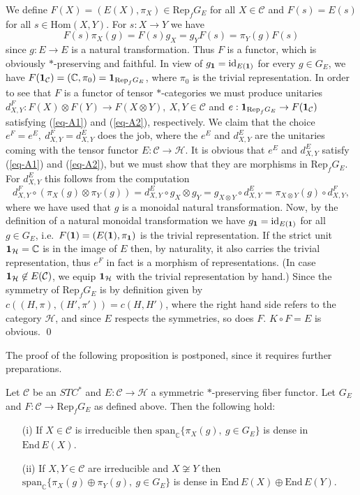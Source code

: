 \documentclass[11pt]{article}
\theoremstyle{definition}
\theoremstyle{definition}
\theoremstyle{remark}
\def\2#1{{\mathcal #1}}
\def\7#1{{\mathbb #1}}
\def\1#1{{\bf #1}}
\newcommand{\Hom}{\mathrm{Hom}}
\newcommand{\End}{\mathrm{End}}
\newcommand{\Rep}{\mathrm{Rep}}
\newcommand{\mcirc}{\circ}
\newcommand{\rarr}{\rightarrow}
\def\id{\mathrm{id}}
\begin{document}
\prf We define $F(X)=(E(X),\pi_X)\in\Rep_fG_E$ for all $X\in\2C$ and $F(s)=E(s)$ for all
$s\in\Hom(X,Y)$. For $s:X\rarr Y$ we have
\[ F(s) \pi_X(g)=F(s)g_X=g_YF(s)=\pi_Y(g)F(s) \]
since $g:E\rarr E$ is a natural transformation. Thus $F$ is a functor, which is obviously
$*$-preserving and faithful. In view of $g_\11=\id_{E(\11)}$ for every $g\in G_E$, we have
$F(\11_\2C)=(\7C,\pi_0)=\11_{\Rep_fG_E}$, where $\pi_0$ is the trivial representation. In order to
see that $F$ is a functor of tensor $*$-categories we must produce unitaries 
$d^F_{X,Y}: F(X)\otimes F(Y)\rarr F(X\otimes Y),\ X,Y\in\2C$ and 
$e:\11_{\Rep_fG_E}\rarr F(\11_\2C)$ satisfying (\ref{eq-A1}) and (\ref{eq-A2}), respectively.
We claim that the choice $e^F=e^E, \ d^F_{X,Y}=d^E_{X,Y}$ does the job, where the $e^E$ and
$d^E_{X,Y}$ are the unitaries coming with the tensor functor $E:\2C\rarr\2H$. It is obvious that  
$e^E$ and $d^E_{X,Y}$ satisfy (\ref{eq-A1}) and (\ref{eq-A2}), but we must show that they are
morphisms in $\Rep_fG_E$. For $d^E_{X,Y}$ this follows from the computation
\[ d^F_{X,Y}\mcirc (\pi_X(g)\otimes\pi_Y(g))=d^E_{X,Y}\mcirc g_X\otimes g_Y
   =g_{X\otimes Y}\mcirc d^E_{X,Y}=\pi_{X\otimes Y}(g)\mcirc d^F_{X,Y}, \]
where we have used that $g$ is a monoidal natural transformation. Now, by the definition of a
natural monoidal transformation we have $g_\11=\id_{E(\11)}$ for all $g\in G_E$, i.e.\
$F(\11)=(E(\11),\pi_\11)$ is the trivial representation. If the strict unit $\11_\2H=\7C$ is in the
image of $E$ then, by naturality, it also carries the trivial representation, thus $e^F$ in fact is
a morphism of representations. (In case $\11_\2H\not\in E(\2C)$, we equip $\11_\2H$ with the trivial
representation by hand.) Since the symmetry of $\Rep_fG_E$ is by definition given by
$c((H,\pi),(H',\pi'))=c(H,H')$, where the right hand side refers to the category $\2H$, and since
$E$ respects the symmetries, so does $F$. $K\circ F=E$ is obvious.
\qed

The proof of the following proposition is postponed, since it requires further preparations.

\bprop \label{prop-dense}
Let $\2C$ be an $STC^*$ and $E:\2C\rarr\2H$ a symmetric $*$-preserving fiber functor. Let $G_E$ and 
$F:\2C\rarr\Rep_fG_E$ as defined above. Then the following hold:
\begin{itemize}
\item[(i)] If $X\in\2C$ is irreducible then $\mathrm{span}_\7C\{ \pi_X(g),\ g\in G_E\}$ is dense in
  $\End\,E(X)$. 
\item[(ii)] If $X,Y\in\2C$ are irreducible and $X\not\cong Y$ then 
$\mathrm{span}_\7C\{ \pi_X(g)\oplus\pi_Y(g),\ g\in G_E\}$ is dense in $\End\,E(X)\oplus\End\,E(Y)$.
\end{itemize}
\eprop
\end{document}

